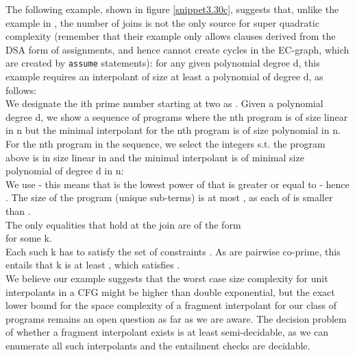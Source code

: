 The following example, shown in figure \ref{snippet3.30c}, suggests that, unlike the example in \cite{GulwaniNecula07}, the number of joins is not the only source for super quadratic complexity (remember that their example only allows clauses derived from the DSA form of assignments, and hence cannot create cycles in the EC-graph, which are created by \lstinline|assume| statements):
for any given polynomial degree d, this example requires an interpolant of size at least a polynomial of degree d, as follows:\\
We designate the ith prime number starting at two as . Given a polynomial degree d, we show a sequence of programs where the nth program is of size linear in n but the minimal interpolant for the nth program is of size polynomial in n.\\
For the nth program in the sequence, we select the integers  s.t. the program above is in size linear in  and the minimal interpolant is of minimal size polynomial of degree d in n:\\
We use  - this means that  is the lowest power of  that is greater or equal to  - hence . The size of the program (unique sub-terms) is at most , as each of  is smaller than .\\
The only equalities that hold at the join are of the form \\
 for some k.\\
Each such k has to satisfy the set of constraints . 
As  are pairwise co-prime, this entails that k is at least , which satisfies . \\
We believe our example suggests that the worst case size complexity for unit interpolants in a CFG might be higher than double exponential, but the exact lower bound for the space complexity of a fragment interpolant for our class of programs remains an open question as far as we are aware. The decision problem of whether a fragment interpolant exists is at least semi-decidable, as we can enumerate all such interpolants and the entailment checks are decidable.

